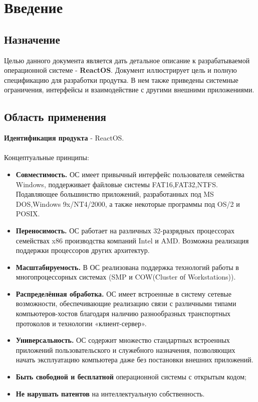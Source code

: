 


\tableofcontents
\clearpage

%
\section{Введение}
\subsection{Назначение}
Целью данного документа является дать детальное описание к разрабатываемой операционной системе - \textbf{ReactOS}. Документ иллюстрирует цель и полную спецификацию для разработки продутка. В нем также приведены системные ограничения, интерфейсы и взаимодействие с другими внешними приложениями.


\subsection{Область применения}
\textbf{Идентификация продукта} - ReactOS.\\\\
Концептуальные принципы:
\begin{itemize}
\item \textbf{Совместимость.} ОС имеет привычный интерфейс пользователя семейства Windows, поддерживает файловые системы FAT16,FAT32,NTFS. Подавляющее большинство приложений, разработанных под MS DOS,Windows 9x/NT4/2000, а также некоторые программы под OS/2 и POSIX.
\item \textbf{Переносимость.} ОС работает на различных 32-разрядных процессорах семействах x86 производства компаний Intel и AMD. Возможна реализация поддержки процессоров других архитектур.
\item \textbf{Масштабируемость.} В ОС реализована поддержка технологий работы в многопроцессорных системах (SMP и COW(Cluster оf Workstations)).
\item \textbf{Распределённая обработка.} ОС имеет встроенные в систему сетевые возможности, обеспечивающие реализацию связи с различными типами компьютеров-хостов благодаря наличию разнообразных транспортных протоколов и технологии «клиент-сервер».
\item \textbf{Универсальность.} ОС содержит множество стандартных встроенных приложений пользовательского и служебного назначения, позволяющих начать эксплуатацию компьютера даже без постановки внешних приложений.
\item \textbf{Быть свободной и бесплатной} операционной системы с открытым кодом;
\item \textbf{Не нарушать патентов} на интеллектуальную собственность.
\end{itemize}

